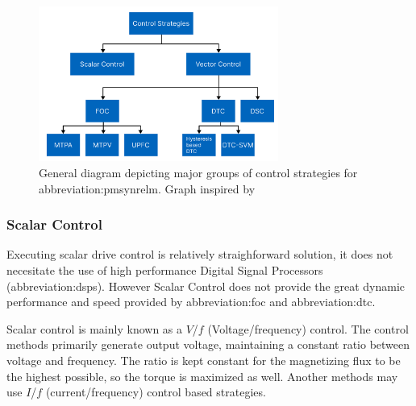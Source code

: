 \documentclass[a4paper, twoside, 11pt]{article}
\begin{document}
        \begin{figure}[htbp!]
            \centering
            \includegraphics[width=0.70\textwidth]{src/png/pmsynrelm-control-strategies.png}
            \caption{General diagram depicting major groups of control strategies for \gls{abbreviation:pmsynrelm}. Graph inspired by \cite{dwivedi-review-on-control-strategies-of-permanent-magnet-assisted-synchronous-reluctance-motor-drive}}
            \label{fig:pmsynrelm-control-strategies}
        \end{figure}

        \subsubsection{Scalar Control}
            Executing scalar drive control is relatively straighforward solution, it does not necesitate the use of high performance Digital Signal Processors (\gls{abbreviation:dsp}s). However Scalar Control does not provide the great dynamic performance and speed provided by \gls{abbreviation:foc} and \gls{abbreviation:dtc}. \cite{dwivedi-review-on-control-strategies-of-permanent-magnet-assisted-synchronous-reluctance-motor-drive}\par
            Scalar control is mainly known as a $V$/$f$ (Voltage/frequency) control. The control methods primarily generate output voltage, maintaining a constant ratio between voltage and frequency. The ratio is kept constant for the magnetizing flux to be the highest possible, so the torque is maximized as well. Another methods may use $I$/$f$ (current/frequency) control based strategies. \cite{heidari-a-review-of-synchronour-relucatence-motor-drive-advancements}
\end{document}
